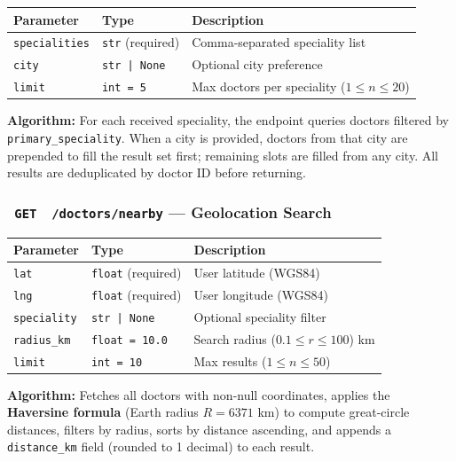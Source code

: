 \documentclass[12pt, a4paper]{article}
\newcommand{\badge}[2]{\colorbox{#1}{\color{white}\small\textbf{\ #2\ }}}
\newcommand{\endpoint}[2]{\texttt{\badge{apicolor}{#1}\ \color{primary}#2}}
\begin{document}
\begin{longtable}{p{3cm} p{2.5cm} p{7cm}}
  \toprule
  \textbf{Parameter} & \textbf{Type} & \textbf{Description} \\
  \midrule
  \texttt{specialities} & \texttt{str} (required) & Comma-separated speciality list \\
  \texttt{city}         & \texttt{str | None}   & Optional city preference \\
  \texttt{limit}        & \texttt{int = 5}       & Max doctors per speciality ($1 \leq n \leq 20$) \\
  \bottomrule
\end{longtable}

\textbf{Algorithm:} For each received speciality, the endpoint queries doctors
filtered by \texttt{primary\_speciality}. When a city is provided, doctors
from that city are prepended to fill the result set first; remaining slots
are filled from any city. All results are deduplicated by doctor ID before
returning.

\subsubsection{\endpoint{GET}{/doctors/nearby} — Geolocation Search}

\begin{longtable}{p{3cm} p{2.5cm} p{7cm}}
  \toprule
  \textbf{Parameter} & \textbf{Type} & \textbf{Description} \\
  \midrule
  \texttt{lat}          & \texttt{float} (required) & User latitude (WGS84) \\
  \texttt{lng}          & \texttt{float} (required) & User longitude (WGS84) \\
  \texttt{speciality}   & \texttt{str | None}       & Optional speciality filter \\
  \texttt{radius\_km}   & \texttt{float = 10.0}     & Search radius ($0.1 \leq r \leq 100$) km \\
  \texttt{limit}        & \texttt{int = 10}         & Max results ($1 \leq n \leq 50$) \\
  \bottomrule
\end{longtable}

\textbf{Algorithm:} Fetches all doctors with non-null coordinates, applies
the \textbf{Haversine formula} (Earth radius $R = 6371$ km) to compute
great-circle distances, filters by radius, sorts by distance ascending,
and appends a \texttt{distance\_km} field (rounded to 1 decimal) to each
result.
\end{document}
